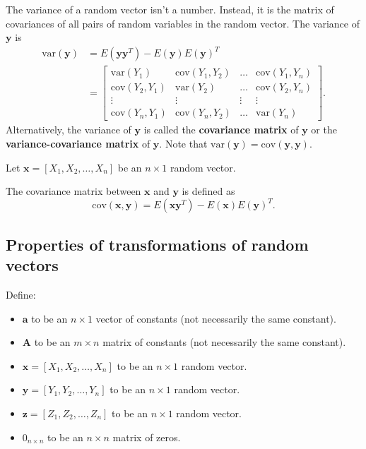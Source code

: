 \documentclass[
]{book}
\providecommand{\tightlist}{%
  \setlength{\itemsep}{0pt}\setlength{\parskip}{0pt}}
\theoremstyle{definition}
\theoremstyle{definition}
\theoremstyle{definition}
\theoremstyle{definition}
\theoremstyle{remark}
\begin{document}
The variance of a random vector isn't a number. Instead, it is the matrix of covariances of all pairs of random variables in the random vector. The variance of \(\mathbf{y}\) is
\[
\begin{aligned}
\mathrm{var}(\mathbf{y}) &= E(\mathbf{y}\mathbf{y}^T )-E(\mathbf{y})E(\mathbf{y})^T\\
&= \begin{bmatrix}\mathrm{var}(Y_1) & \mathrm{cov}(Y_1,Y_2) &\dots &\mathrm{cov}(Y_1,Y_n)\\\mathrm{cov}(Y_2,Y_1 )&\mathrm{var}(Y_2)&\dots&\mathrm{cov}(Y_2,Y_n)\\\vdots&\vdots&\vdots&\vdots\\
\mathrm{cov}(Y_n,Y_1)&\mathrm{cov}(Y_n,Y_2)&\dots&\mathrm{var}(Y_n)\end{bmatrix}.
\end{aligned}
\]
Alternatively, the variance of \(\mathbf{y}\) is called the \textbf{covariance matrix} of \(\mathbf{y}\) or the \textbf{variance-covariance matrix} of \(\mathbf{y}\). Note that \(\mathrm{var}(\mathbf{y})=\mathrm{cov}(\mathbf{y}, \mathbf{y})\).

Let \(\mathbf{x} = [X_1, X_2, \ldots, X_n]\) be an \(n\times 1\) random vector.

The covariance matrix between \(\mathbf{x}\) and \(\mathbf{y}\) is defined as
\[
\mathrm{cov}(\mathbf{x}, \mathbf{y}) = E(\mathbf{x}\mathbf{y}^T) - E(\mathbf{x}) E(\mathbf{y})^T.
\]

\hypertarget{properties-of-transformations-of-random-vectors}{%
\subsection{Properties of transformations of random vectors}\label{properties-of-transformations-of-random-vectors}}

Define:

\begin{itemize}
\tightlist
\item
  \(\mathbf{a}\) to be an \(n\times 1\) vector of constants (not necessarily the same constant).
\item
  \(\mathbf{A}\) to be an \(m\times n\) matrix of constants (not necessarily the same constant).
\item
  \(\mathbf{x}=[X_1,X_2,\ldots,X_n]\) to be an \(n\times 1\) random vector.
\item
  \(\mathbf{y}=[Y_1,Y_2,\ldots,Y_n]\) to be an \(n\times 1\) random vector.
\item
  \(\mathbf{z}=[Z_1,Z_2,\ldots,Z_n]\) to be an \(n\times 1\) random vector.
\item
  \(0_{n\times n}\) to be an \(n\times n\) matrix of zeros.
\end{itemize}
\end{document}
